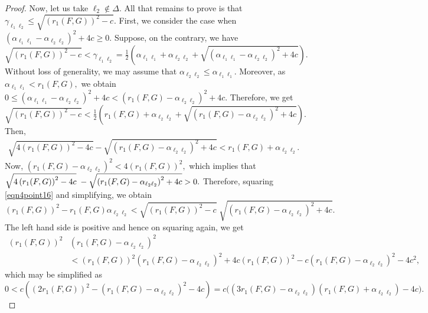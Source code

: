 \documentclass[final,1p,times]{elsarticle}
\begin{document}
\begin{proof}
		Now, let us take $\ell_2 \notin \Delta.$ All that remains to prove is that $\gamma_{ \ell_1 \ell_2 } \leq \sqrt{\left(r_{1} (F,G)\right)^2-c}. $  First, we consider the case when $\left(\alpha_{\ell_1 \ell_1} -  \alpha_{\ell_2 \ell_2} \right)^2 + 4c \geq 0.$  Suppose, on the contrary, we have $\sqrt{\left(r_{1} (F,G)\right)^2-c} < \gamma_{ \ell_1 \ell_2 }= \frac{1}{2} \left( \alpha_{\ell_1 \ell_1}   +  \alpha_{\ell_2 \ell_2} + \sqrt{\left( \alpha_{\ell_1 \ell_1} -   \alpha_{\ell_2 \ell_2}\right)^2 +4c}\right) .$ Without loss of generality, we may assume that $ \alpha_{\ell_2 \ell_2} \leq  \alpha_{\ell_1 \ell_1}.$ Moreover, as  $ \alpha_{\ell_1 \ell_1} <r_{1} (F,G),$ we obtain $0 \leq \left( \alpha_{\ell_1 \ell_1} - \alpha_{\ell_2 \ell_2}\right)^2 + 4c < \left(r_{1} (F,G) - \alpha_{\ell_2 \ell_2} \right)^2 + 4c. $ Therefore, we get  $\sqrt{\left(r_{1} (F,G)\right)^2-c} < \frac{1}{2} \left( r_{1} (F,G) + \alpha_{\ell_2 \ell_2} + \sqrt{\left( r_{1} (F,G)  -  \alpha_{\ell_2 \ell_2} \right)^2 + 4c} \right).$ Then,
		\begin{align}\label{eqn4point16}
			\sqrt{4\left(r_{1} (F,G)\right)^2-4c} - \sqrt{\left( r_{1} (F,G) -  \alpha_{\ell_2 \ell_2}\right)^2 +4c} < r_{1} (F,G) +   \alpha_{\ell_2 \ell_2} .
		\end{align}
		Now, $\left( r_{1} (F,G) -  \alpha_{\ell_2 \ell_2}\right)^2  < 4\left(r_{1} (F,G)\right)^2, $  which implies that $\sqrt{4\left(r_{1} (F,G)\right)^2-4c}\; - \\ \sqrt{\left( r_{1} (F,G) -   \alpha_{\ell_2 \ell_2}\right)^2 +4c} > 0.$ Therefore, squaring \eqref{eqn4point16} and simplifying, we obtain
		$$ \left(r_{1} (F,G)\right)^2 - r_{1} (F,G)   \alpha_{\ell_2 \ell_2} < \sqrt{\left(r_{1} (F,G)\right)^2-c} \; \sqrt{\left( r_{1} (F,G) -   \alpha_{\ell_2 \ell_2}\right)^2 +4c}. $$
		The left hand side is positive and hence on squaring again, we get
		\begin{align*}
			\left(r_{1} (F,G)\right)^2 &\left( r_{1} (F,G) -  \alpha_{\ell_2 \ell_2}    \right) ^2  \\&	<\left(r_{1} (F,G)\right)^2 \left( r_{1} (F,G) -  \alpha_{\ell_2 \ell_2}    \right) ^2  + 4c \left(r_{1} (F,G)\right)^2 -c\left(  r_{1} (F,G) -  \alpha_{\ell_2 \ell_2}     \right)^2 -4c^2,
		\end{align*}
		which may be simplified as
		$$ 0< c\left(\left(2{r_{1}} (F,G)\right)^2 - \left( r_{1} (F,G) -  \alpha_{\ell_2 \ell_2}    \right) ^2 -4c  \right)  = c\bigg(   \left(3r_{1} (F,G) -\alpha_{\ell_2 \ell_2}    \right)    \left(r_{1} (F,G) + \alpha_{\ell_2 \ell_2}  \right) -4c \bigg).$$

\end{proof}
\end{document}
